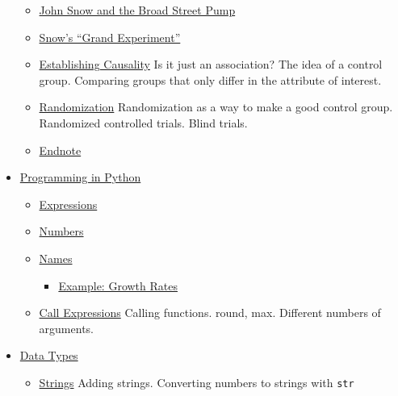 \begin{itemize}
  \begin{itemize}
  \tightlist
  \item
    \href{chapters/02/1/observation-and-visualization-john-snow-and-the-broad-street-pump.md}{John
    Snow and the Broad Street Pump}
  \item
    \href{chapters/02/2/snow-s-grand-experiment.md}{Snow's ``Grand
    Experiment''}
  \item
    \href{chapters/02/3/establishing-causality.md}{Establishing
    Causality} Is it just an association? The idea of a control group.
    Comparing groups that only differ in the attribute of interest.
  \item
    \href{chapters/02/4/randomization.md}{Randomization} Randomization
    as a way to make a good control group. Randomized controlled trials.
    Blind trials.
  \item
    \href{chapters/02/5/endnote.md}{Endnote}
  \end{itemize}
\item
  \href{chapters/03/programming-in-python.md}{Programming in Python}

  \begin{itemize}
  \tightlist
  \item
    \href{chapters/03/1/expressions.md}{Expressions}
  \item
    \href{chapters/03/2/numbers.md}{Numbers}
  \item
    \href{chapters/03/3/names.md}{Names}

    \begin{itemize}
    \tightlist
    \item
      \href{chapters/03/3/1/example-growth-rates.md}{Example: Growth
      Rates}
    \end{itemize}
  \item
    \href{chapters/03/4/call-expressions.md}{Call Expressions} Calling
    functions. round, max. Different numbers of arguments.
  \end{itemize}
\item
  \href{chapters/04/data-types.md}{Data Types}

  \begin{itemize}
  \tightlist
  \item
    \href{chapters/04/1/strings.md}{Strings} Adding strings. Converting
    numbers to strings with \texttt{str}


\end{itemize}
\end{itemize}
